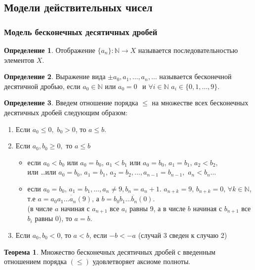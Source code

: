 \documentclass[a4paper, 12pt]{article}
\newcommand{\N}{\mathbb{N}}
\theoremstyle{definition}
\newtheorem*{definition}{Определение}
\newtheorem*{theorem}{Теорема}
\begin{document}
    \subsection{Модели действительных чисел}
    \subsubsection{Модель бесконечных десятичных дробей}
        \begin{definition}
            Отображение $\{a_n\}: \N \to X$ называется последовательностью элементов $X$.
        \end{definition}
        \begin{definition}
            Выражение вида $\pm a_0,a_1,\dots, a_n, \dots$ называется бесконечной десятичной дробью, если $a_0\in \N$ или $a_0=0 \hspace{5pt}$ и $\forall i\in \N$ $a_i \in \{0,1,\dots, 9\}$.
        \end{definition}
        \begin{definition}
            Введем отношение порядка $\leq$ на множестве всех бесконечных десятичных дробей следующим образом:
            \begin{enumerate}
                \item Если $a_0\leq 0,$ $b_0>0$, то $a\leq b$.
                \item Если $a_0, b_0\geq 0,$ то $a\leq b$
                \begin{itemize}
                    \item если $a_0<b_0$ или $a_0=b_0$, $a_1<b_1$ или $a_0=b_0$, $a_1=b_1$, $a_2<b_2$,\\ или \dots или $a_0=b_0$, $a_1=b_1$, $a_2=b_2, \dots, a_{n-1}=b_{n-1},$ $a_n<b_n\dots$
                    \item если $a_0=b_0$, $a_1=b_1, \dots, a_n\ne 9, b_n=a_{n}+1$.
                    $a_{n+k}=9$, $b_{n+k}=0$, $\forall k \in \N$, т.е $a=\overline{a_0a_1...a_n(9)}$, а $b=\overline{b_0b_1...b_n(0)}$.\\
                    (в числе $a$ начиная с $a_{n+1}$ все $a_i$ равны 9, а в числе $b$ начиная с $b_{n+1}$ все $b_i$ равны 0), то $a=b$.
                \end{itemize}
                \item Если $a_0, b_0<0$, то $a<b$, если $-b<-a$ (случай 3 сведен к случаю 2)
            \end{enumerate}
        \end{definition} 
        \begin{theorem}
            Множество бесконечных десятичных дробей с введенным отношением порядка $(\leq)$ удовлетворяет аксиоме полноты.
        \end{theorem} 
\end{document}
